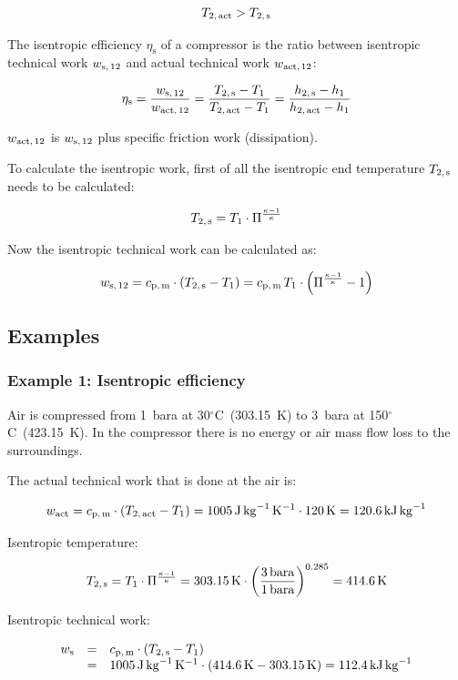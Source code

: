 \documentclass[11pt,a4paper,english,twoside]{scrreprt}
\newcommand{\gradC}{${}^\circ$C}      %
\begin{document}
\[T_\text{2,\,act} >T_\text{2,\,s}\]

The isentropic efficiency $\eta_\text{s}$ of a compressor is the ratio between isentropic technical work $w_\text{s,\,12}$ and actual technical work $w_\text{act,\,12}$:

\[\eta_\text{s} = \frac{w_\text{s,\,12}}{w_\text{act,\,12}} =\frac{T_\text{2,\,s} -T_1}{T_\text{2,\,act} -T_1} = \frac{h_\text{2,\,s}-h_1}{h_\text{2,\,act}-h_1}\]


$w_\text{act,\,12} $ is $w_\text{s,\,12}$ plus specific friction work (dissipation).


To calculate the isentropic work, first of all the isentropic end temperature $T_\text{2,\,s}$ needs to be calculated:

\[T_\text{2,\,s} = T_1 \cdot \Pi ^{\frac{\kappa -1}{\kappa }} \]

   

Now the isentropic technical work can be calculated as:

\[w_\text{s,\,12} = c_\text{p,\,m} \cdot (T_\text{2,\,s} -T_1 ) = c_\text{p,\,m} \, T_1 \cdot \left(\Pi ^{\frac{\kappa -1}{\kappa } } -1\right)\]


\subsection{Examples}


\subsubsection{Example 1: Isentropic efficiency}

Air is compressed from 1~bara at 30\gradC\ (303.15~K) to 3~bara at  150\gradC\ (423.15~K). In the compressor there is no energy or air mass flow loss to the surroundings.

The actual technical work that is done at the air is:

\[
w_\text{act} =c_\text{p,\,m} \cdot (T_\text{2,\,act} -T_1 ) = \SI{1005}{\joule\per\kilo\gram\per\kelvin} \cdot \SI{120}{\kelvin} = \SI{120.6}{\kilo\joule\per\kilogram}
\]

Isentropic temperature:

\[
T_\text{2,\,s} =T_1 \cdot \Pi ^{\frac{\kappa -1}{\kappa } }  = \SI{303.15}{\kelvin} \cdot \left(\frac{\SI{3}{bara}}{\SI{1}{bara}} \right)^{0.285}  = \SI{414.6}{\kelvin}
\]

Isentropic technical work:

\[\begin{array}{lcl}
w_\text{s} &=& c_\text{p,\,m} \cdot (T_\text{2,\,s} -T_1 ) \\
          &=& \SI{1005}{\joule\per\kilogram\per\kelvin} \cdot \left(\SI{414.6}{\kelvin} - \SI{303.15}{\kelvin} \right) = \SI{112.4}{\kilo\joule\per\kilogram}
\end{array}\]
\end{document}

